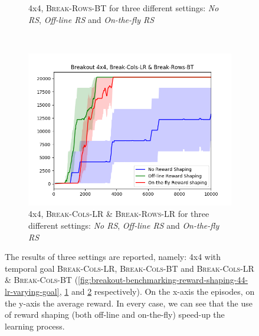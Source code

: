 \begin{figure}[h]
\begin{subfigure}[b]{0.65\textwidth}
	 	\caption{\Breakout 4x4, \textsc{Break-Rows-BT} for three different settings: \emph{No RS}, \emph{Off-line RS} and \emph{On-the-fly RS}}
		\label{fig:breakout-benchmarking-reward-shaping-44-bt-varying-goal}
	\end{subfigure}
	~ %
	\begin{subfigure}[b]{0.65\textwidth}
		\includegraphics[width=\textwidth]{images/b44-both-comparison}
		\caption{\Breakout 4x4, \textsc{Break-Cols-LR \& Break-Rows-LR} for three different settings: \emph{No RS}, \emph{Off-line RS} and \emph{On-the-fly RS}}
		\label{fig:breakout-benchmarking-reward-shaping-44-lr-bt-varying-goal}
	\end{subfigure}
	\caption{The results of three settings are reported, namely: \Breakout 4x4 with temporal goal \textsc{Break-Cols-LR}, \textsc{Break-Cols-BT} and \textsc{Break-Cols-LR \& \textsc{Break-Cols-BT}} (\ref{fig:breakout-benchmarking-reward-shaping-44-lr-varying-goal}, \ref{fig:breakout-benchmarking-reward-shaping-44-bt-varying-goal} and  \ref{fig:breakout-benchmarking-reward-shaping-44-lr-bt-varying-goal} respectively). On the x-axis the episodes, on the y-axis the average reward. In every case, we can see that the use of reward shaping (both off-line and on-the-fly) speed-up the learning process. }\label{fig:breakout-benchmarking-reward-shaping-44-different-goal}
\end{figure}
\clearpage

